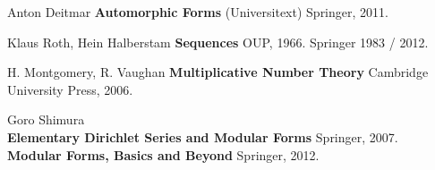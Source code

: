 \documentclass[12pt]{article}
\begin{document}
\begin{thebibliography}{}

\item Anton Deitmar \textbf{Automorphic Forms} (Universitext) Springer, 2011.
\item Klaus Roth, Hein Halberstam \textbf{Sequences} OUP, 1966. Springer 1983 / 2012.
\item H. Montgomery, R. Vaughan \textbf{Multiplicative Number Theory}  Cambridge University Press, 2006.
\item Goro Shimura \\
\textbf{Elementary Dirichlet Series and Modular Forms} Springer, 2007. \\
\textbf{Modular Forms, Basics and Beyond}  Springer, 2012.

 
\end{thebibliography} 
\end{document}
